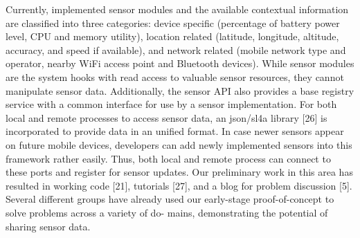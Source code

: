Currently, implemented sensor modules and
the available contextual information are classified into three
categories: device specific (percentage of battery power level,
CPU and memory utility), location related (latitude, longitude,
altitude, accuracy, and speed if available), and network related
(mobile network type and operator, nearby WiFi access point
and Bluetooth devices). While sensor modules are the system
hooks with read access to valuable sensor resources, they
cannot manipulate sensor data. Additionally, the sensor API
also provides a base registry service with a common interface
for use by a sensor implementation. For both local and remote
processes to access sensor data, an json/sl4a library [26] 
is incorporated to provide data in an unified format. In case
newer sensors appear on future mobile devices, developers can
add newly implemented sensors into this framework rather
easily. 
Thus, both local and remote
process can connect to these ports and register for sensor
updates.
Our preliminary work in this area has resulted in working
code [21], tutorials [27], and a blog for problem discussion [5].
Several different groups have already used our early-stage
proof-of-concept to solve problems across a variety of do-
mains, demonstrating the potential of sharing sensor data.


